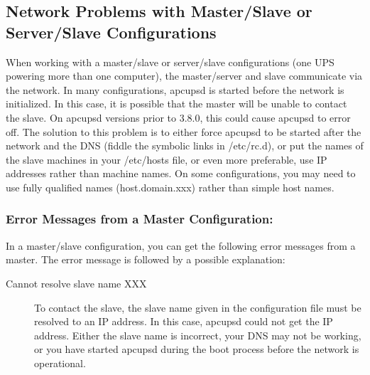 {{{{{{\label{Network-Problems-with-Master_002fSlave-or-Server_002fSlave-Configuratio%
ns}

\subsection*{Network Problems with Master/Slave or Server/Slave
Configurations}

\label{index-Problems_002c-Master_002fSlave-159}
\label{index-Problems_002c-networking-160}
When working with a master/slave or server/slave configurations (one UPS
powering more than one computer), the master/server and slave communicate via
the network. In many configurations, apcupsd is started before the network is
initialized. In this case, it is possible that the master will be unable to
contact the slave. On apcupsd versions prior to 3.8.0, this could cause
apcupsd to error off. The solution to this problem is to either force apcupsd
to be started after the network and the DNS (fiddle the symbolic links in
/etc/rc.d), or put the names of the slave machines in your /etc/hosts file, or
even more preferable, use IP addresses rather than machine names. On some
configurations, you may need to use fully qualified names (host.domain.xxx)
rather than simple host names. 

\label{Error-Messages-from-a-Master-Configuration}

\subsubsection*{Error Messages from a Master Configuration:}

In a master/slave configuration, you can get the following error messages from
a master. The error message is followed by a possible explanation: 

\begin{description}
\item[Cannot resolve slave name XXX]
   \label{Cannot-resolve-slave-name-XXX}
To contact the slave, the slave name given in the configuration file must be
resolved to an IP address. In this case, apcupsd could not get the IP address.
Either the slave name is incorrect, your DNS may not be working, or you have
started apcupsd during the boot process before the network is operational. 


\end{description}}}}}}}
